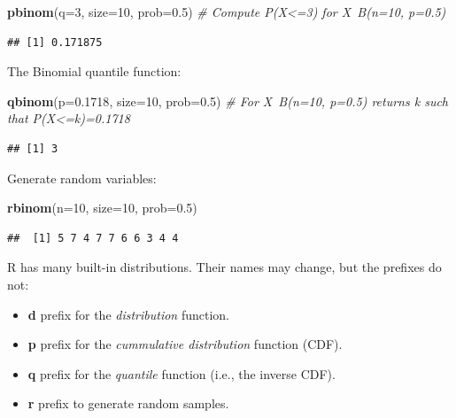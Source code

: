 \documentclass[]{book}
\newenvironment{Shaded}{\begin{snugshade}}{\end{snugshade}}
\newcommand{\KeywordTok}[1]{\textcolor[rgb]{0.13,0.29,0.53}{\textbf{#1}}}
\newcommand{\DataTypeTok}[1]{\textcolor[rgb]{0.13,0.29,0.53}{#1}}
\newcommand{\DecValTok}[1]{\textcolor[rgb]{0.00,0.00,0.81}{#1}}
\newcommand{\FloatTok}[1]{\textcolor[rgb]{0.00,0.00,0.81}{#1}}
\newcommand{\CommentTok}[1]{\textcolor[rgb]{0.56,0.35,0.01}{\textit{#1}}}
\newcommand{\NormalTok}[1]{#1}
\providecommand{\tightlist}{%
  \setlength{\itemsep}{0pt}\setlength{\parskip}{0pt}}
\theoremstyle{definition}
\theoremstyle{definition}
\theoremstyle{definition}
\theoremstyle{remark}
\begin{document}
\begin{Shaded}
\begin{Highlighting}[]
\KeywordTok{pbinom}\NormalTok{(}\DataTypeTok{q=}\DecValTok{3}\NormalTok{, }\DataTypeTok{size=}\DecValTok{10}\NormalTok{, }\DataTypeTok{prob=}\FloatTok{0.5}\NormalTok{) }\CommentTok{# Compute P(X<=3) for X~B(n=10, p=0.5)   }
\end{Highlighting}
\end{Shaded}

\begin{verbatim}
## [1] 0.171875
\end{verbatim}

The Binomial quantile function:

\begin{Shaded}
\begin{Highlighting}[]
\KeywordTok{qbinom}\NormalTok{(}\DataTypeTok{p=}\FloatTok{0.1718}\NormalTok{, }\DataTypeTok{size=}\DecValTok{10}\NormalTok{, }\DataTypeTok{prob=}\FloatTok{0.5}\NormalTok{) }\CommentTok{# For X~B(n=10, p=0.5) returns k such that P(X<=k)=0.1718}
\end{Highlighting}
\end{Shaded}

\begin{verbatim}
## [1] 3
\end{verbatim}

Generate random variables:

\begin{Shaded}
\begin{Highlighting}[]
\KeywordTok{rbinom}\NormalTok{(}\DataTypeTok{n=}\DecValTok{10}\NormalTok{, }\DataTypeTok{size=}\DecValTok{10}\NormalTok{, }\DataTypeTok{prob=}\FloatTok{0.5}\NormalTok{)}
\end{Highlighting}
\end{Shaded}

\begin{verbatim}
##  [1] 5 7 4 7 7 6 6 3 4 4
\end{verbatim}

R has many built-in distributions. Their names may change, but the
prefixes do not:

\begin{itemize}
\tightlist
\item
  \textbf{d} prefix for the \emph{distribution} function.
\item
  \textbf{p} prefix for the \emph{cummulative distribution} function
  (CDF).
\item
  \textbf{q} prefix for the \emph{quantile} function (i.e., the inverse
  CDF).
\item
  \textbf{r} prefix to generate random samples.
\end{itemize}
\end{document}
